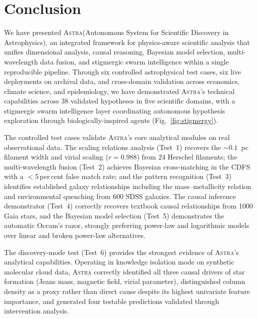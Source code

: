 \documentclass[usenatbib]{rasti}
\newcommand{\astra}{\textsc{Astra}\xspace}
\begin{document}
\section{Conclusion}
\label{sec:conclusion}

We have presented \astra (Autonomous System for Scientific Discovery in Astrophysics), an integrated framework for physics-aware scientific analysis that unifies dimensional analysis, causal reasoning, Bayesian model selection, multi-wavelength data fusion, and stigmergic swarm intelligence within a single reproducible pipeline.
Through six controlled astrophysical test cases, six live deployments on archival data, and cross-domain validation across economics, climate science, and epidemiology, we have demonstrated \astra's technical capabilities across 38 validated hypotheses in five scientific domains, with a stigmergic swarm intelligence layer coordinating autonomous hypothesis exploration through biologically-inspired agents (Fig.~\ref{fig:stigmergy}).

The controlled test cases validate \astra's core analytical modules on real observational data.
The scaling relations analysis (Test~1) recovers the ${\sim}0.1$~pc filament width and virial scaling ($r = 0.988$) from 24 Herschel filaments; the multi-wavelength fusion (Test~2) achieves Bayesian cross-matching in the CDFS with a $<$5\,per\,cent false match rate; and the pattern recognition (Test~3) identifies established galaxy relationships including the mass--metallicity relation and environmental quenching from 600 SDSS galaxies.
The causal inference demonstrator (Test~4) correctly recovers textbook causal relationships from 1000 Gaia stars, and the Bayesian model selection (Test~5) demonstrates the automatic Occam's razor, strongly preferring power-law and logarithmic models over linear and broken power-law alternatives.

The discovery-mode test (Test~6) provides the strongest evidence of \astra's analytical capabilities.
Operating in knowledge isolation mode on synthetic molecular cloud data, \astra correctly identified all three causal drivers of star formation (Jeans mass, magnetic field, virial parameter), distinguished column density as a proxy rather than direct cause despite its highest univariate feature importance, and generated four testable predictions validated through intervention analysis.
\end{document}
